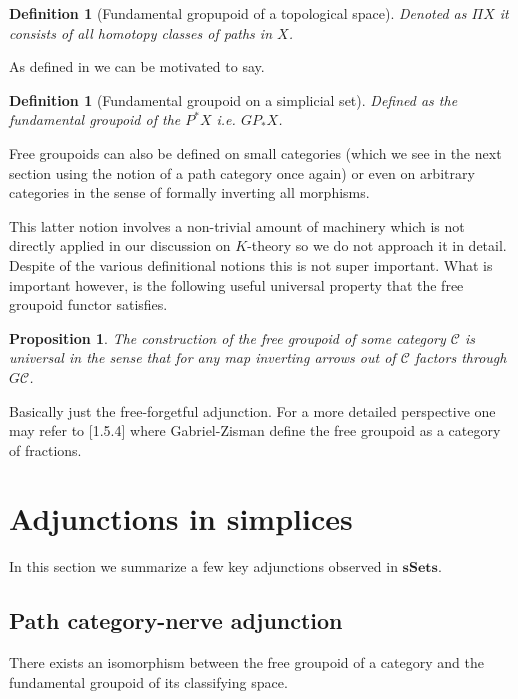 \documentclass[12pt]{report}
\numberwithin{equation}{section}
\newtheorem{definition}[dummy]{Definition}
\newtheorem{proposition}[dummy]{Proposition}
\begin{document}
	\begin{definition}[Fundamental gropupoid of a topological space]
		Denoted as $\Pi X$ it consists of all homotopy classes of paths in $X$.
	\end{definition}
	
	As defined in \cite{gabriel1967calculus} we can be motivated to say.
	\begin{definition}[Fundamental groupoid on a simplicial set]
		Defined as the fundamental groupoid of the $P^*X$ i.e. \(GP_*X\).
	\end{definition}
	
	Free groupoids can also be defined on small categories (which we see in the next section using the notion of a path category once again) or even on arbitrary categories in the sense of formally inverting all morphisms. 
	
	This latter notion involves a non-trivial amount of machinery which is not directly applied in our discussion on \( K \)-theory so we do not approach it in detail. Despite of the various definitional notions this is not super important. What is important however, is the following useful universal property that the free groupoid functor satisfies. 
	\begin{proposition}\label{prop:universalfreegrpd}
		The construction of the free groupoid of some category \( \mathcal{C} \) is universal in the sense that for any map inverting arrows out of \( \mathcal{C} \) factors through \( G\mathcal{C} \).
	\end{proposition}
	
	Basically just the free-forgetful adjunction. For a more detailed perspective one may refer to \cite{gabriel1967calculus}[1.5.4] where Gabriel-Zisman define the free groupoid as a category of fractions.
	
	\section{Adjunctions in simplices}
	
	In this section we summarize a few key adjunctions observed in \( \mathbf{sSets} \).
	
	\subsection{Path category-nerve adjunction}
	There exists an isomorphism between the free groupoid of a category and the fundamental groupoid of its classifying space.
	
\end{document}
